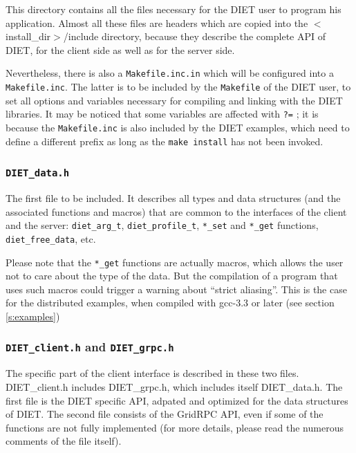   This directory contains all the files necessary for the DIET user to program his
  application. Almost all these files are headers which are copied into the
  \textsf{$<$install\_dir$>$/include} directory, because they describe the
  complete API of DIET, for the client side as well as for the server side.

  Nevertheless, there is also a \texttt{Makefile.inc.in} which will be configured
  into a \texttt{Makefile.inc}.
  The latter is to be included by the \texttt{Makefile} of the
  DIET user, to set all options and variables necessary for compiling and
  linking with the DIET libraries.
  It may be noticed that some variables are affected with
  \texttt{?=} ; it is because the \texttt{Makefile.inc} is also included by the
  DIET examples, which need to define a different prefix as long as the
  \texttt{make install} has not been invoked.



  \subsubsection{\tt DIET\_data.h}

  The first file to be included. It describes all types and data structures (and
      the associated functions and macros) that are common to the interfaces of the
  client and the server: \verb+diet_arg_t+, \verb+diet_profile_t+, \verb+*_set+
  and \verb+*_get+ functions, \verb+diet_free_data+, etc.

  Please note that the \verb+*_get+ functions are actually macros, which allows
  the user not to care about the type of the data. But the compilation of a
  program that uses such macros could trigger a warning about ``strict aliasing''.
  This is the case for the distributed examples, when compiled with
\textsf{gcc-3.3} or later (see section \ref{s:examples})


  \subsubsection{{\tt DIET\_client.h} and {\tt DIET\_grpc.h}}

  The specific part of the client interface is described in these two files.
  \textsf{DIET\_client.h} includes \textsf{DIET\_grpc.h}, which includes itself
  \textsf{DIET\_data.h}.
  The first file is the DIET specific API, adpated and optimized for the data
  structures of DIET. The second file consists of the GridRPC API, even if some of
  the functions are not fully implemented (for more details, please read the
      numerous comments of the file itself).


